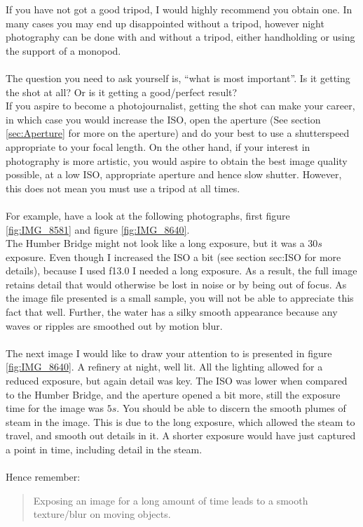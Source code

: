 If you have not got a good tripod, I would highly recommend you obtain one. In many cases you may end up disappointed without a tripod, however night photography can be done with and without a tripod, either handholding or using the support of a monopod.
\\
\\
The question you need to ask yourself is, ``what is most important''. Is it getting the shot at all? Or is it getting a good/perfect result?
\\
If you aspire to become a photojournalist, getting the shot can make your career, in which case you would increase the \gls{ISO}, open the \gls{aperture} (See section \ref{sec:Aperture} for more on the \gls{aperture}) and do your best to use a \gls{shutterspeed} appropriate to your focal length. On the other hand, if your interest in photography is more artistic, you would aspire to obtain the best image quality possible, at a low \gls{ISO}, appropriate aperture and hence slow \gls{shutter}. However, this does not mean you must use a tripod at all times.
\\
\\
For example, have a look at the following photographs, first figure \ref{fig:IMG_8581} and figure \ref{fig:IMG_8640}.
\\
The Humber Bridge might not look like a long \gls{exposure}, but it was a $30s$ \gls{exposure}. Even though I increased the \gls{ISO} a bit (see section {sec:ISO} for more details), because I used f13.0 I needed a long \gls{exposure}. As a result, the full image retains detail that would otherwise be lost in noise or by being out of focus. As the image file presented is a small sample, you will not be able to appreciate this fact that well. Further, the water has a silky smooth appearance because any waves or ripples are smoothed out by motion blur.
\\
\\
The next image I would like to draw your attention to is presented in figure \ref{fig:IMG_8640}. A refinery at night, well lit. All the lighting allowed for a reduced \gls{exposure}, but again detail was key. The \gls{ISO} was lower when compared to the Humber Bridge, and the \gls{aperture} opened a bit more, still the \gls{exposure} time for the image was $5s$. You should be able to discern the smooth plumes of steam in the image. This is due to the long \gls{exposure}, which allowed the steam to travel, and smooth out details in it. A shorter \gls{exposure} would have just captured a point in time, including detail in the steam.
\\
\\
Hence remember:
\begin{quote}
Exposing an image for a long amount of time leads to a smooth texture/blur on moving objects.
\end{quote}

